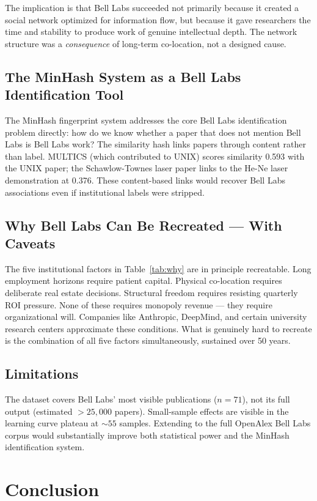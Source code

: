 \documentclass[journal]{IEEEtran}
\begin{document}
The implication is that Bell Labs succeeded not primarily because it created
a social network optimized for information flow, but because it gave researchers
the time and stability to produce work of genuine intellectual depth. The
network structure was a \textit{consequence} of long-term co-location, not
a designed cause.

\subsection{The MinHash System as a Bell Labs Identification Tool}
The MinHash fingerprint system addresses the core Bell Labs identification
problem directly: how do we know whether a paper that does not mention Bell
Labs is Bell Labs work? The similarity hash links papers through content
rather than label. MULTICS (which contributed to UNIX) scores similarity
0.593 with the UNIX paper; the Schawlow-Townes laser paper links to the
He-Ne laser demonstration at 0.376. These content-based links would recover
Bell Labs associations even if institutional labels were stripped.

\subsection{Why Bell Labs Can Be Recreated --- With Caveats}
The five institutional factors in Table~\ref{tab:why} are in principle
recreatable. Long employment horizons require patient capital. Physical
co-location requires deliberate real estate decisions. Structural freedom
requires resisting quarterly ROI pressure. None of these requires monopoly
revenue --- they require organizational will. Companies like Anthropic,
DeepMind, and certain university research centers approximate these conditions.
What is genuinely hard to recreate is the combination of all five factors
simultaneously, sustained over 50 years.

\subsection{Limitations}
The dataset covers Bell Labs' most visible publications ($n{=}71$), not its
full output (estimated $>25{,}000$ papers). Small-sample effects are visible
in the learning curve plateau at $\sim55$ samples. Extending to the full
OpenAlex Bell Labs corpus would substantially improve both statistical power
and the MinHash identification system.


\section{Conclusion}
\label{sec:conclusion}
\end{document}
